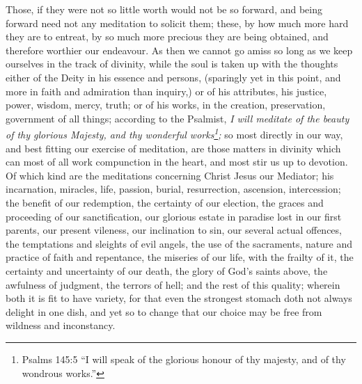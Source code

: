 Those, if they were not so little worth would not be so forward, and being forward need not any meditation to solicit them; these, by how much more hard they are to entreat, by so much more precious they are being obtained, and therefore worthier our endeavour. As then we cannot go amiss so long as we keep ourselves in the track of divinity, while the soul is taken up with the thoughts either of the Deity in his essence and persons, (sparingly yet in this point, and more in faith and admiration than inquiry,) or of his attributes, his justice, power, wisdom, mercy, truth; or of his works, in the creation, preservation, government of all things; according to the Psalmist, \emph{I will meditate of the beauty of thy glorious Majesty, and thy wonderful works\footnote{Psalms 145:5 ``I will speak of the glorious honour of thy majesty, and of thy wondrous works.''};} so most directly in our way, and best fitting our exercise of meditation, are those matters in divinity which can most of all work compunction in the heart, and most stir us up to devotion. Of which kind are the meditations concerning Christ Jesus our Mediator; his incarnation, miracles, life, passion, burial, resurrection, ascension, intercession; the benefit of our redemption, the certainty of our election, the graces and proceeding of our sanctification, our glorious estate in paradise lost in our first parents, our present vileness, our inclination to sin, our several actual offences, the temptations and sleights of evil angels, the use of the sacraments, nature and practice of faith and repentance, the miseries of our life, with the frailty of it, the certainty and uncertainty of our death, the glory of God's saints above, the awfulness of judgment, the terrors of hell; and the rest of this quality; wherein both it is fit to have variety, for that even the strongest stomach doth not always delight in one dish, and yet so to change that our choice may be free from wildness and inconstancy. 


